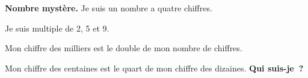 \documentclass[exercice]{thedocument}%
\begin{document}
%
{\bfseries Nombre mystère.}\vskip10pt
Je suis un nombre a quatre chiffres.\par\noindent
Je suis multiple de 2, 5 et 9.\par\noindent
Mon chiffre des milliers est le double de mon nombre de chiffres.\par\noindent
Mon chiffre des centaines est le quart de mon chiffre des dizaines.\vskip10pt
{\bfseries Qui suis-je~?}
\end{document}
